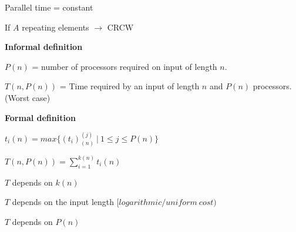 Parallel time = constant

If $A$ repeating elements $\rightarrow$ CRCW

\textbf{Informal definition}

$P(n)$ = number of processors required on input of length $n$.

$T(n, P(n))$ = Time required by an input of length $n$ and $P(n)$ processors. (Worst case)

\textbf{Formal definition}

$t_i(n) = max\{(t_i)^{(j)}_{(n)} \ | \ 1 \leq j \leq P(n)\}$

$T(n, P(n)) = \sum_{i=1}^{k(n)}{t_i(n)}$

$T$ depends on $k(n)$

$T$ depends on the input length $[logarithmic / uniform \ cost)$

$T$ depends on $P(n)$